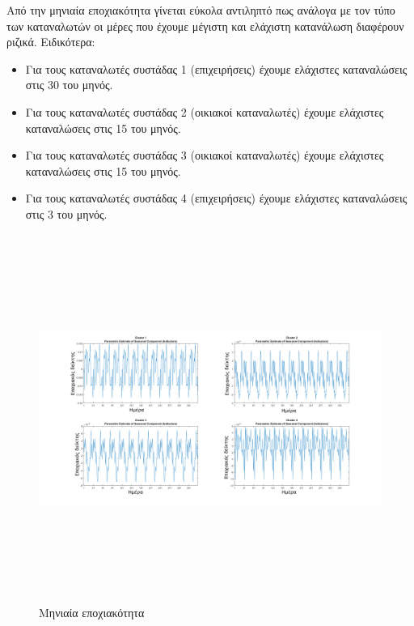 Από την μηνιαία εποχιακότητα γίνεται εύκολα αντιληπτό πως ανάλογα με τον τύπο των καταναλωτών οι μέρες που έχουμε μέγιστη και ελάχιστη κατανάλωση διαφέρουν ριζικά. Ειδικότερα:
\begin{itemize}
\item Για τους καταναλωτές συστάδας 1 (επιχειρήσεις) έχουμε ελάχιστες καταναλώσεις στις 30 του μηνός.
\item Για τους καταναλωτές συστάδας 2 (οικιακοί καταναλωτές) έχουμε ελάχιστες καταναλώσεις στις 15 του μηνός.
\item Για τους καταναλωτές συστάδας 3 (οικιακοί καταναλωτές) έχουμε ελάχιστες καταναλώσεις στις 15 του μηνός.
\item Για τους καταναλωτές συστάδας 4 (επιχειρήσεις) έχουμε ελάχιστες καταναλώσεις στις 3 του μηνός.
\end{itemize}
\begin{figure}[ht!]
\centering
\includegraphics[width=180mm, height=120mm]{../../plots/Trend_estimation/seasonal_month_ALL.png}
\caption{Μηνιαία εποχιακότητα}
\label{fig:season daypermonth}
\end{figure}
